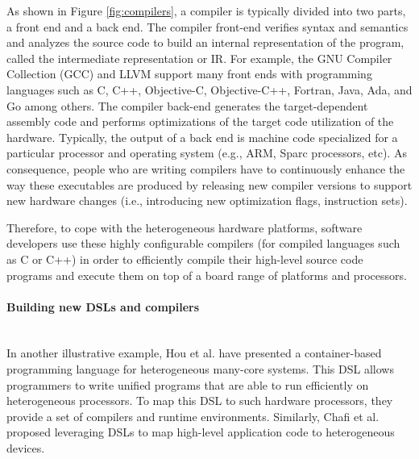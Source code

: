 As shown in Figure \ref{fig:compilers}, a compiler is typically divided into two parts, a front end and a back end. The compiler front-end verifies syntax and semantics and analyzes the source code to build an internal representation of the program, called the intermediate representation or IR. For example, the GNU Compiler Collection (GCC) and LLVM support many front ends with programming languages such as C, C++, Objective-C, Objective-C++, Fortran, Java, Ada, and Go among others. The compiler back-end generates the target-dependent assembly code and performs optimizations of the target code utilization of the hardware. Typically, the output of a back end is machine code specialized for a particular processor and operating system (e.g., ARM, Sparc processors, etc).
As consequence, people who are writing compilers have to continuously enhance the way these executables are produced by releasing new compiler versions to support new hardware changes (i.e., introducing new optimization flags, instruction sets). 

Therefore, to cope with the heterogeneous hardware platforms, software developers use these highly configurable compilers (for compiled languages such as C or C++) in order to efficiently compile their high-level source code programs and execute them on top of a board range of platforms and processors. 

\paragraph{Building new DSLs and compilers}~\\ 
In another illustrative example, Hou et al.\cite{hou2010spap} have presented a container-based programming language for heterogeneous many-core systems. This DSL allows programmers to write unified programs that are able to run efficiently on heterogeneous processors. To map this DSL to such hardware processors, they provide a set of compilers and runtime environments. Similarly, Chafi et al.\cite{chafi2010language,chafi2011domain} proposed leveraging DSLs to map high-level application code to heterogeneous devices.

